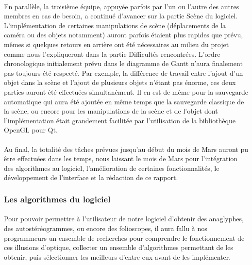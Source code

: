 \paragraph{}
En parallèle, la troisième équipe, appuyée parfois par l'un ou l'autre des autres membres en cas de besoin, a continué d'avancer sur la partie Scène du logiciel. L'implémentation de certaines manipulations de scène (déplacements de la caméra ou des objets notamment) auront parfois étaient plus rapides que prévu, mêmes si quelques retours en arrière ont été nécessaires au milieu du projet comme nous l'expliqueront dans la partie Difficultés rencontrées. L'ordre chronologique initialement prévu dans le diagramme de Gantt n'aura finalement pas toujours été respecté. Par exemple, la différence de travail entre l'ajout d'un objet dans la scène et l'ajout de plusieurs objets n'étant pas énorme, ces deux parties auront été effectuées simultanément. Il en est de même pour la sauvegarde automatique qui aura été ajoutée en même temps que la sauvegarde classique de la scène, ou encore pour les manipulations de la scène et de l'objet dont l'implémentation était grandement facilitée par l'utilisation de la bibliothèque OpenGL pour Qt.

\paragraph{}
Au final, la totalité des tâches prévues jusqu'au début du mois de Mars auront pu être effectuées dans les temps, nous laissant le mois de Mars pour l'intégration des algorithmes au logiciel, l'amélioration de certaines fonctionnalités, le développement de l'interface et la rédaction de ce rapport.


\subsubsection{Les algorithmes du logiciel}
\paragraph{}
Pour pouvoir permettre à l'utilisateur de notre logiciel d'obtenir des anaglyphes, des autostéréogrammes, ou encore des folioscopes, il aura fallu à nos programmeurs un ensemble de recherches pour comprendre le fonctionnement de ces illusions d'optique, collecter un ensemble d'algorithmes permettant de les obtenir, puis sélectionner les meilleurs d'entre eux avant de les implémenter.

